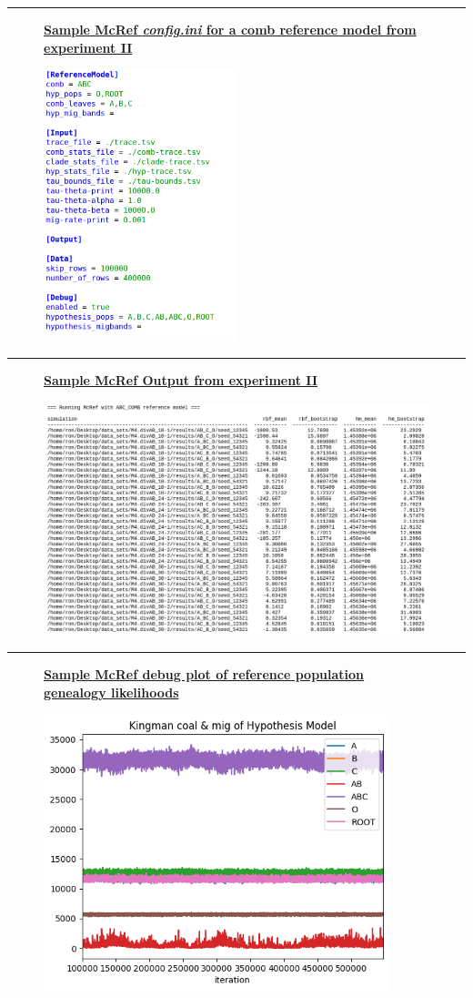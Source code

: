 \documentclass[11pt]{article}
\newcommand{\1}{\mathbbm{1}}
\newcommand{\figuretitle}[1]{
	\centering
	\underline{\textbf{#1}}
	\par
	\medskip
}
\begin{document}
\noindent\rule{16cm}{0.4pt}

\begin{figure}[H]
\figuretitle{Sample McRef \textit{config.ini} for a comb reference model from experiment II}
\includegraphics[width=0.5\textwidth]{appendix/sample_McRef_configuration}
\label{fig:sample_McRef_output}
\end{figure}

\noindent\rule{16cm}{0.4pt}

\begin{figure}[H]
\figuretitle{Sample McRef Output from experiment II}
\includegraphics[width=1.0\textwidth]{appendix/sample_McRef_output}
\label{fig:sample_McRef_output}
\end{figure}

\noindent\rule{16cm}{0.4pt}

\begin{figure}[H]
\figuretitle{Sample McRef debug plot of reference population genealogy likelihoods}
\includegraphics[width=0.9\textwidth]{appendix/hyp_ln_ld_line}
\label{fig:sample_McRef_output}
\end{figure}
\end{document}
